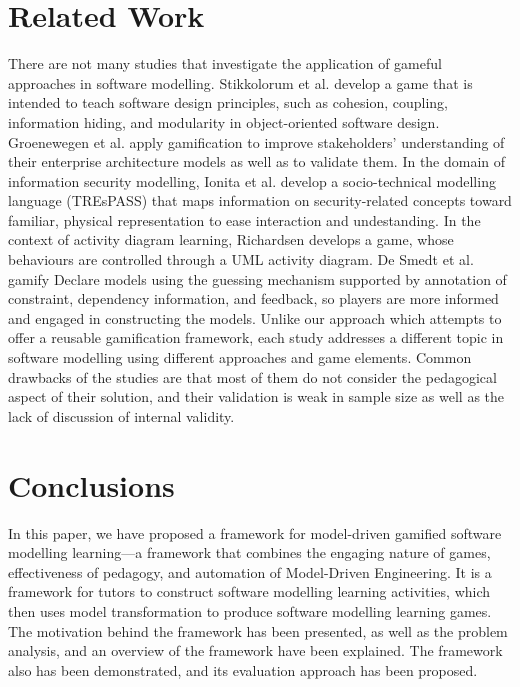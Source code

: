 \documentclass[conference]{IEEEtran}
\begin{document}
\section{Related Work}
\label{Related Work}
There are not many studies that investigate the application of gameful approaches in software modelling. Stikkolorum et al. \cite{Stikkolorum2014} develop a game that is intended to teach software design principles, such as cohesion, coupling, information hiding, and modularity in object-oriented software design. Groenewegen et al. \cite{Groenewegen2010} apply gamification to improve stakeholders' understanding of their enterprise architecture models as well as to validate them. In the domain of information security modelling, Ionita et al. \cite{Ionita2015} develop a socio-technical modelling language (TREsPASS) that maps information on security-related concepts toward familiar, physical representation to ease interaction and undestanding. In the context of activity diagram learning, Richardsen \cite{Richardsen2014} develops a game, whose behaviours are controlled through a UML activity diagram. De Smedt et al. \cite{de2015gamification} gamify Declare models using the guessing mechanism supported by annotation of constraint, dependency information, and feedback, so players are more informed and engaged in constructing the models. Unlike our approach which attempts to offer a reusable gamification framework, each study addresses a different topic in software modelling using different approaches and game elements. Common drawbacks of the studies are that most of them do not consider the pedagogical aspect of their solution, and their validation is weak in sample size as well as the lack of discussion of internal validity.

\section{Conclusions}
\label{Conclusions}
In this paper, we have proposed a framework for model-driven gamified software modelling learning---a framework that combines the engaging nature of games, effectiveness of pedagogy, and automation of Model-Driven Engineering. It is a framework for tutors to construct software modelling learning activities, which then uses model transformation to produce software modelling learning games. The motivation behind the framework has been presented, as well as the problem analysis, and an overview of the framework have been explained. The framework also has been demonstrated, and its evaluation approach has been proposed.
\end{document}
